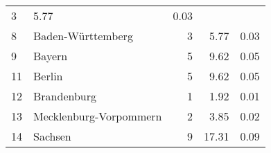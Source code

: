 \begin{longtable}{lXrrr}
       \num{3} &
       \num[round-mode=places,round-precision=2]{5,77} &
         \num[round-mode=places,round-precision=2]{0,03} \\

     8 &
     \multicolumn{1}{X}{ Baden-Württemberg   } &


       \num{3} &
       \num[round-mode=places,round-precision=2]{5,77} &
         \num[round-mode=places,round-precision=2]{0,03} \\

     9 &
     \multicolumn{1}{X}{ Bayern   } &


       \num{5} &
       \num[round-mode=places,round-precision=2]{9,62} &
         \num[round-mode=places,round-precision=2]{0,05} \\

     11 &
     \multicolumn{1}{X}{ Berlin   } &


       \num{5} &
       \num[round-mode=places,round-precision=2]{9,62} &
         \num[round-mode=places,round-precision=2]{0,05} \\

     12 &
     \multicolumn{1}{X}{ Brandenburg   } &


       \num{1} &
       \num[round-mode=places,round-precision=2]{1,92} &
         \num[round-mode=places,round-precision=2]{0,01} \\

     13 &
     \multicolumn{1}{X}{ Mecklenburg-Vorpommern   } &


       \num{2} &
       \num[round-mode=places,round-precision=2]{3,85} &
         \num[round-mode=places,round-precision=2]{0,02} \\

     14 &
     \multicolumn{1}{X}{ Sachsen   } &


       \num{9} &
       \num[round-mode=places,round-precision=2]{17,31} &
         \num[round-mode=places,round-precision=2]{0,09} \\


\end{longtable}
